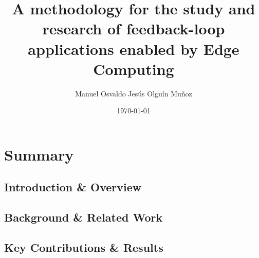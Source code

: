 \documentclass[electronic,oldfontcommands]{kthesis}
\begin{document}
\title{A methodology for the study and research of feedback-loop applications enabled by Edge Computing}
\subtitle{{}}
\author{Manuel {Osvaldo Jesús} {Olguín Muñoz}}
\date{\today}
\address{%
	KTH Royal Institute of Technology\\%
	School of Electrical Engineering and Computer Science\\%
	Division of Information Science and Engineering\\%
	SE-10044 Stockholm\\%
	Sweden%
}

\maketitle

\frontmatter %





\mainmatter %

\tableofcontents%

\part{Summary}\label{part:summary}
\chapter{Introduction \& Overview}\label{chap:introduction}


\chapter{Background \& Related Work}\label{chap:relatedwork}


\chapter{Key Contributions \& Results}\label{chap:contributions}

\end{document}
